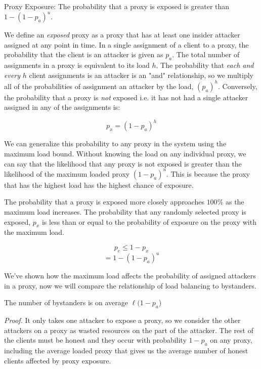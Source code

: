 \begin{lemma}{Proxy Exposure: The probability that a proxy is exposed is greater than $1 - (1-p_a)^{u}$.}

We define an \textit{exposed} proxy as a proxy that has at least one insider attacker assigned at any point in time. In a single assignment of a client to a proxy, the probability that the client is an attacker is given as $p_a$. The total number of assignments in a proxy is equivalent to its load $h$. The probability that \textit{each and every} $h$ client assignments is an attacker is an "and" relationship, so we multiply all of the probabilities of assignment an attacker by the load, $(p_a)^h$. Conversely, the probability that a proxy is \textit{not} exposed i.e. it has not had a single attacker assigned in any of the assignments is:

$$p_x = (1-p_a)^h$$

We can generalize this probability to any proxy in the system using the maximum load bound. Without knowing the load on any individual proxy, we can say that the likelihood that any proxy is not exposed is greater than the likelihood of the maximum loaded proxy $(1-p_a)^{u}$. This is because the proxy that has the highest load has the highest chance of exposure.

The probability that a proxy is exposed more closely approaches $100\%$ as the maximum load increases. The probability that any randomly selected proxy is exposed, $p_x$ is less than or equal to the probability of exposure on the proxy with the maximum load.


$$p_e \leq 1 - p_x$$
$$ = 1 - (1-p_a)^{u}$$

\end{lemma}

We've shown how the maximum load affects the probability of assigned attackers in a proxy, now we will compare the relationship of load balancing to bystanders. 

\begin{theorem}{The number of bystanders is on average $\ell (1-p_a$)}

\end{theorem}

\textit{Proof.} It only takes one attacker to expose a proxy, so we consider the other attackers on a proxy as wasted resources on the part of the attacker. The rest of the clients must be honest and they occur with probability $1-p_a$ on any proxy, including the average loaded proxy that gives us the average number of honest clients affected by proxy exposure. 

